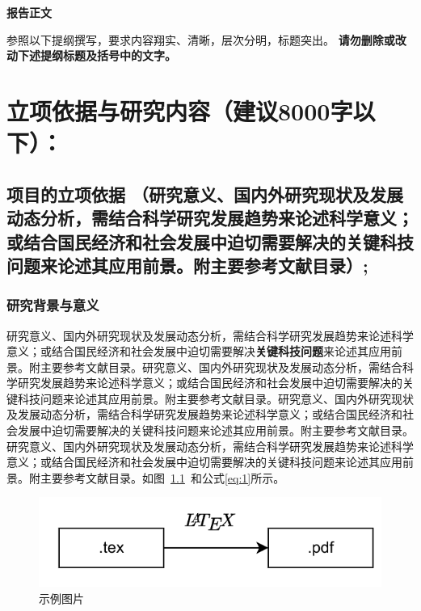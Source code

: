 \documentclass{nsfc}
\begin{document}
\begin{center}
    \Large\kaishu\textbf{报告正文}
\end{center}

\begin{onehalfspace}
    \large\kaishu
    参照以下提纲撰写，要求内容翔实、清晰，层次分明，标题突出。
    {\color{nsfc_blue}\textbf{请勿删除或改动下述提纲标题及括号中的文字。}}
\end{onehalfspace}

\chapter{立项依据与研究内容（建议8000字以下）：}

\section{
    \textbf{项目的立项依据}
    （研究意义、国内外研究现状及发展动态分析，需结合科学研究发展趋势来论述科学意义；或结合国民经济和社会发展中迫切需要解决的关键科技问题来论述其应用前景。附主要参考文献目录）;
}

\subsection{研究背景与意义}

研究意义、国内外研究现状及发展动态分析，需结合科学研究发展趋势来论述科学意义；或结合国民经济和社会发展中迫切需要解决\textbf{关键科技问题}来论述其应用前景。附主要参考文献目录。研究意义、国内外研究现状及发展动态分析，需结合科学研究发展趋势来论述科学意义；或结合国民经济和社会发展中迫切需要解决的关键科技问题来论述其应用前景\cite{latex2e,latex:companion}。附主要参考文献目录。研究意义、国内外研究现状及发展动态分析，需结合科学研究发展趋势来论述科学意义；或结合国民经济和社会发展中迫切需要解决的关键科技问题来论述其应用前景\citet{latex:companion}。附主要参考文献目录。研究意义、国内外研究现状及发展动态分析，需结合科学研究发展趋势来论述科学意义\citet{lesk:1977,texbook}；或结合国民经济和社会发展中迫切需要解决的关键科技问题来论述其应用前景。附主要参考文献目录\cite{knuth:1984}。如图~\ref{fig:test}~和公式\eqref{eq:1}所示。

\begin{figure}[h]
    \centering
    \includegraphics[width=0.4\linewidth]{example_fig.png}
    \caption{示例图片}
    \label{fig:test}
\end{figure}
\end{document}
